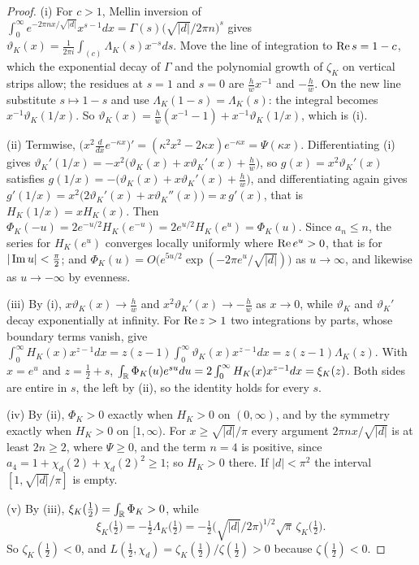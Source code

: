 \begin{proof}
(i) For $c>1$, Mellin inversion of $\int_0^\infty e^{-2\pi nx/\sqrt{|d|}}x^{s-1}dx=\Gamma(s)\big(\sqrt{|d|}/2\pi n\big)^s$ gives $\vartheta_K(x)=\frac1{2\pi i}\int_{(c)}\Lambda_K(s)x^{-s}ds$. Move the line of integration to $\operatorname{Re} s=1-c$, which the exponential decay of $\Gamma$ and the polynomial growth of $\zeta_K$ on vertical strips allow; the residues at $s=1$ and $s=0$ are $\frac hwx^{-1}$ and $-\frac hw$. On the new line substitute $s\mapsto1-s$ and use $\Lambda_K(1-s)=\Lambda_K(s)$: the integral becomes $x^{-1}\vartheta_K(1/x)$. So $\vartheta_K(x)=\frac hw(x^{-1}-1)+x^{-1}\vartheta_K(1/x)$, which is (i).

(ii) Termwise, $\big(x^2\frac d{dx}e^{-\kappa x}\big)'=(\kappa^2x^2-2\kappa x)e^{-\kappa x}=\Psi(\kappa x)$. Differentiating (i) gives $\vartheta_K'(1/x)=-x^2\big(\vartheta_K(x)+x\vartheta_K'(x)+\frac hw\big)$, so $g(x)=x^2\vartheta_K'(x)$ satisfies $g(1/x)=-\big(\vartheta_K(x)+x\vartheta_K'(x)+\frac hw\big)$, and differentiating again gives $g'(1/x)=x^2\big(2\vartheta_K'(x)+x\vartheta_K''(x)\big)=x\,g'(x)$, that is $H_K(1/x)=xH_K(x)$. Then $\Phi_K(-u)=2e^{-u/2}H_K(e^{-u})=2e^{u/2}H_K(e^u)=\Phi_K(u)$. Since $a_n\le n$, the series for $H_K(e^u)$ converges locally uniformly where $\operatorname{Re} e^u>0$, that is for $|\operatorname{Im} u|<\frac\pi2$; and $\Phi_K(u)=O\big(e^{5u/2}\exp(-2\pi e^u/\sqrt{|d|})\big)$ as $u\to\infty$, and likewise as $u\to-\infty$ by evenness.

(iii) By (i), $x\vartheta_K(x)\to\frac hw$ and $x^2\vartheta_K'(x)\to-\frac hw$ as $x\to0$, while $\vartheta_K$ and $\vartheta_K'$ decay exponentially at infinity. For $\operatorname{Re} z>1$ two integrations by parts, whose boundary terms vanish, give $\int_0^\infty H_K(x)x^{z-1}dx=z(z-1)\int_0^\infty\vartheta_K(x)x^{z-1}dx=z(z-1)\Lambda_K(z)$. With $x=e^u$ and $z=\frac12+s$, $\int_{\mathbb{R}}\Phi_K(u)e^{su}du=2\int_0^\infty H_K(x)x^{z-1}dx=\xi_K(z)$. Both sides are entire in $s$, the left by (ii), so the identity holds for every $s$.

(iv) By (ii), $\Phi_K>0$ exactly when $H_K>0$ on $(0,\infty)$, and by the symmetry exactly when $H_K>0$ on $[1,\infty)$. For $x\ge\sqrt{|d|}/\pi$ every argument $2\pi nx/\sqrt{|d|}$ is at least $2n\ge2$, where $\Psi\ge0$, and the term $n=4$ is positive, since $a_4=1+\chi_d(2)+\chi_d(2)^2\ge1$; so $H_K>0$ there. If $|d|<\pi^2$ the interval $[1,\sqrt{|d|}/\pi]$ is empty.

(v) By (iii), $\xi_K(\frac12)=\int_{\mathbb{R}}\Phi_K>0$, while
\[
\xi_K\big(\tfrac12\big)=-\tfrac12\Lambda_K\big(\tfrac12\big)=-\tfrac12\big(\sqrt{|d|}/2\pi\big)^{1/2}\sqrt\pi\,\zeta_K\big(\tfrac12\big).
\]
So $\zeta_K(\frac12)<0$, and $L(\frac12,\chi_d)=\zeta_K(\frac12)/\zeta(\frac12)>0$ because $\zeta(\frac12)<0$.
\end{proof}

